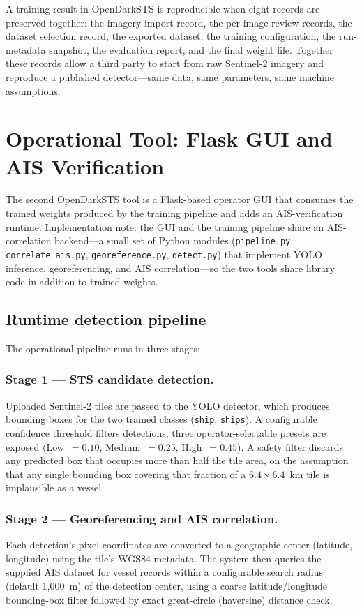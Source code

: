 \documentclass[10pt, letterpaper, twocolumn]{article}
\begin{document}
A training result in OpenDarkSTS is reproducible when eight records are preserved together: the imagery import record, the per-image review records, the dataset selection record, the exported dataset, the training configuration, the run-metadata snapshot, the evaluation report, and the final weight file. Together these records allow a third party to start from raw Sentinel-2 imagery and reproduce a published detector---same data, same parameters, same machine assumptions.


\section{Operational Tool: Flask GUI and AIS Verification}
\label{sec:operational-tool}

The second OpenDarkSTS tool is a Flask-based operator GUI that consumes the trained weights produced by the training pipeline and adds an AIS-verification runtime. Implementation note: the GUI and the training pipeline share an AIS-correlation backend---a small set of Python modules (\texttt{pipeline.py}, \texttt{correlate\_ais.py}, \texttt{georeference.py}, \texttt{detect.py}) that implement YOLO inference, georeferencing, and AIS correlation---so the two tools share library code in addition to trained weights.

\subsection{Runtime detection pipeline}

The operational pipeline runs in three stages:

\subsubsection{Stage 1 --- STS candidate detection.}
Uploaded Sentinel-2 tiles are passed to the YOLO detector, which produces bounding boxes for the two trained classes (\texttt{ship}, \texttt{ships}). A configurable confidence threshold filters detections; three operator-selectable presets are exposed (Low~$=0.10$, Medium~$=0.25$, High~$=0.45$). A safety filter discards any predicted box that occupies more than half the tile area, on the assumption that any single bounding box covering that fraction of a $6.4 \times 6.4$~km tile is implausible as a vessel.

\subsubsection{Stage 2 --- Georeferencing and AIS correlation.}
Each detection's pixel coordinates are converted to a geographic center (latitude, longitude) using the tile's WGS84 metadata. The system then queries the supplied AIS dataset for vessel records within a configurable search radius (default 1{,}000~m) of the detection center, using a coarse latitude/longitude bounding-box filter followed by exact great-circle (haversine) distance check.
\end{document}
